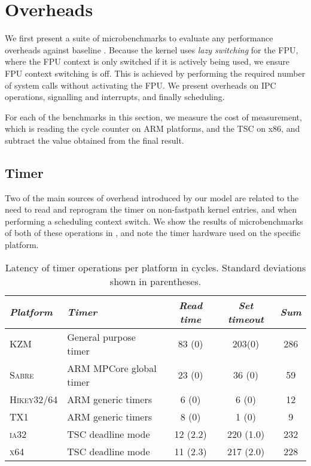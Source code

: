 \section{Overheads}

We first present a suite of microbenchmarks to evaluate any performance overheads against baseline
\selfour.
Because the kernel uses \emph{lazy switching} for the \gls{FPU}, where the \gls{FPU} context is only
switched if it is actively being used, we ensure \gls{FPU} context switching
is off. This is achieved by performing the required number of system calls 
without activating the \gls{FPU}. We present
overheads on IPC operations, signalling and interrupts, and finally scheduling. 

For each of the benchmarks in this section, we measure the cost of measurement, which is reading the
cycle counter on ARM platforms, and the \gls{TSC} on x86, and subtract the value obtained
from the final result.

\subsection{Timer}
\label{s:eval-timer}

Two of the main sources of overhead introduced by our model are related to the need to read and
reprogram the timer on non-fastpath kernel entries, and when performing a scheduling context switch.
We show the results of microbenchmarks of both of these operations in , and
note the timer hardware used on the specific platform. 

\begin{table}[t]\centering
{}
\begin{tabularx}{\textwidth}{lXccc}\toprule
    \emph{Platform} & \emph{Timer} & \emph{Read time} & \emph{Set timeout} & \emph{Sum}
    \\\midrule
    \textsc{KZM}               & General purpose timer    & 83 (0)   & 203(0)  & 286   \\
    \textsc{Sabre}             & ARM MPCore global timer  & 23 (0)   & 36 (0)  & 59    \\
    \textsc{Hikey32/64}        & ARM generic timers       &  6 (0)   &  6 (0)  & 12    \\
    \textsc{TX1}               & ARM generic timers       &  8 (0)   &  1 (0)  & 9     \\
    \textsc{ia32}              & TSC deadline mode        & 12 (2.2) & 220 (1.0) & 232 \\
    \textsc{x64}               & TSC deadline mode        & 11 (2.3) & 217 (2.0) & 228 \\
    \bottomrule\hline
\end{tabularx}
\caption[Latency of timer operations.]{Latency of timer operations per platform in cycles. Standard deviations shown
in parentheses.}
\label{t:evaluation-timer}
\end{table}

